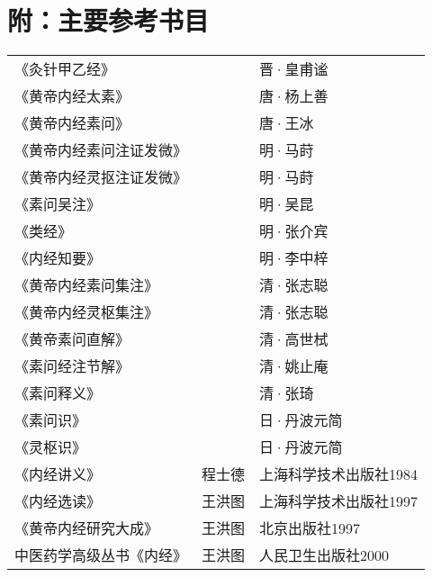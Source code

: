 \documentclass[12pt]{ctexbook}
\begin{document}
\fi

\chapter*{附：主要参考书目}
\begin{table}[h]
  \centering
  \begin{tabular}{lll}
  《灸针甲乙经》 &  & 晋·皇甫谧 \\
  《黄帝内经太素》 &  & 唐·杨上善 \\
  《黄帝内经素问》 &  & 唐·王冰 \\
  《黄帝内经素问注证发微》 &  & 明·马莳 \\
  《黄帝内经灵抠注证发微》 &  & 明·马莳 \\
  《素问吴注》 &  & 明·吴昆 \\
  《类经》 &  & 明·张介宾 \\
  《内经知要》 &  & 明·李中梓 \\
  《黄帝内经素问集注》 &  & 清·张志聪 \\
  《黄帝内经灵枢集注》 &  & 清·张志聪 \\
  《黄帝素问直解》 &  & 清·高世栻 \\
  《素问经注节解》 &  & 清·姚止庵 \\
  《素问释义》 &  & 清·张琦 \\
  《素问识》 &  & 日·丹波元简 \\
  《灵枢识》 &  & 日·丹波元简 \\
  《内经讲义》 & 程士德 & 上海科学技术出版社1984 \\
  《内经选读》 & 王洪图 & 上海科学技术出版社1997 \\
  《黄帝内经研究大成》 & 王洪图 & 北京出版社1997 \\
  中医药学高级丛书《内经》 & 王洪图 & 人民卫生出版社2000
  \end{tabular}
\end{table}
\ifx \allfiles \undefined
\end{document}
